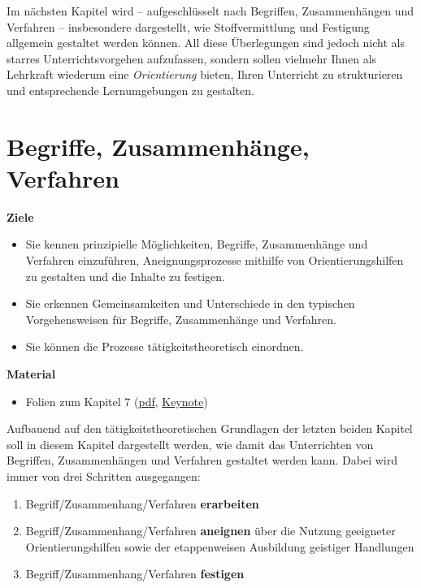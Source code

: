 \documentclass[
]{scrbook}
\providecommand{\tightlist}{%
  \setlength{\itemsep}{0pt}\setlength{\parskip}{0pt}}
\renewenvironment{quote}{
  \list{}{
	\leftmargin0.2cm   %
    \rightmargin\leftmargin
      	\def\FrameCommand
    {%
        {\color{quoteColor}\vrule width 2pt}%
        \hspace{0pt}%
    }%
    \MakeFramed{\advance \hsize -\width \FrameRestore}    \color{quoteColor}
    }
  \item\relax
}
{\endlist\color{black}\endMakeFramed}
\theoremstyle{definition}
\theoremstyle{definition}
\theoremstyle{definition}
\theoremstyle{definition}
\theoremstyle{remark}
\begin{document}
Im nächsten Kapitel wird -- aufgeschlüsselt nach Begriffen, Zusammenhängen und Verfahren -- insbesondere dargestellt, wie Stoffvermittlung und Festigung allgemein gestaltet werden können.
All diese Überlegungen sind jedoch nicht als starres Unterrichtsvorgehen aufzufassen, sondern sollen vielmehr Ihnen als Lehrkraft wiederum eine \emph{Orientierung} bieten, Ihren Unterricht zu strukturieren und entsprechende Lernumgebungen zu gestalten.

\chapter{Begriffe, Zusammenhänge, Verfahren}\label{begriffe-zusammenhuxe4nge-verfahren}

\begin{quote}
\textbf{Ziele}

\begin{itemize}
\tightlist
\item
  Sie kennen prinzipielle Möglichkeiten, Begriffe, Zusammenhänge und Verfahren einzuführen, Aneignungsprozesse mithilfe von Orientierungshilfen zu gestalten und die Inhalte zu festigen.\\
\item
  Sie erkennen Gemeinsamkeiten und Unterschiede in den typischen Vorgehensweisen für Begriffe, Zusammenhänge und Verfahren.\\
\item
  Sie können die Prozesse tätigkeitstheoretisch einordnen.
\end{itemize}

\textbf{Material}

\begin{itemize}
\tightlist
\item
  Folien zum Kapitel 7 (\href{files/Stoffdidaktik2024-07-BegriffeZusammenhaengeVerfahren.pdf}{pdf}, \href{files/Stoffdidaktik2024-07-BegriffeZusammenhaengeVerfahren.key}{Keynote})
\end{itemize}
\end{quote}

Aufbauend auf den tätigkeitstheoretischen Grundlagen der letzten beiden Kapitel soll in diesem Kapitel dargestellt werden, wie damit das Unterrichten von Begriffen, Zusammenhängen und Verfahren gestaltet werden kann. Dabei wird immer von drei Schritten ausgegangen:

\begin{enumerate}
\def\labelenumi{\arabic{enumi}.}
\tightlist
\item
  Begriff/Zusammenhang/Verfahren \textbf{erarbeiten}\\
\item
  Begriff/Zusammenhang/Verfahren \textbf{aneignen} über die Nutzung geeigneter Orientierungshilfen sowie der etappenweisen Ausbildung geistiger Handlungen\\
\item
  Begriff/Zusammenhang/Verfahren \textbf{festigen}
\end{enumerate}
\end{document}
